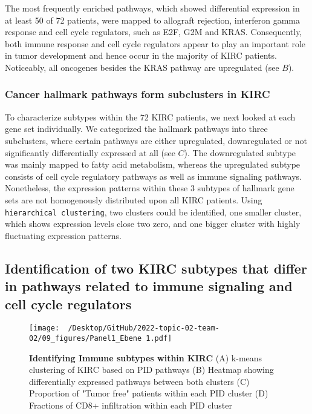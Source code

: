 \documentclass[
  parskip,
  oneside]{scrreprt}
\begin{document}
The most frequently enriched pathways, which showed differential
expression in at least 50 of 72 patients, were mapped to allograft
rejection, interferon gamma response and cell cycle regulators, such as
E2F, G2M and KRAS. Consequently, both immune response and cell cycle
regulators appear to play an important role in tumor development and
hence occur in the majority of KIRC patients. Noticeably, all oncogenes
besides the KRAS pathway are upregulated (see  \(B\)).

\hypertarget{cancer-hallmark-pathways-form-subclusters-in-kirc}{%
\subsubsection{Cancer hallmark pathways form subclusters in
KIRC}\label{cancer-hallmark-pathways-form-subclusters-in-kirc}}

To characterize subtypes within the 72 KIRC patients, we next looked at
each gene set individually. We categorized the hallmark pathways into
three subclusters, where certain pathways are either upregulated,
downregulated or not significantly differentially expressed at all (see
 \(C\)). The downregulated subtype was mainly mapped to
fatty acid metabolism, whereas the upregulated subtype consists of cell
cycle regulatory pathways as well as immune signaling pathways.
Nonetheless, the expression patterns within these 3 subtypes of hallmark
gene sets are not homogenously distributed upon all KIRC patients. Using
\texttt{hierarchical\ clustering}, two clusters could be identified, one
smaller cluster, which shows expression levels close two zero, and one
bigger cluster with highly fluctuating expression patterns.

\hypertarget{identification-of-two-kirc-subtypes-that-differ-in-pathways-related-to-immune-signaling-and-cell-cycle-regulators}{%
\subsection{Identification of two KIRC subtypes that differ in pathways
related to immune signaling and cell cycle
regulators}\label{identification-of-two-kirc-subtypes-that-differ-in-pathways-related-to-immune-signaling-and-cell-cycle-regulators}}

\begin{figure}[h]
  \texttt{[image: ~/Desktop/GitHub/2022-topic-02-team-02/09\_figures/Panel1\_Ebene 1.pdf]}
  \caption{\textbf{Identifying Immune subtypes within KIRC }(A) k-means clustering of KIRC based on PID pathways (B) Heatmap showing differentially expressed pathways between both clusters (C) Proportion of "Tumor free" patients within each PID cluster (D) Fractions of CD8+ infiltration within each PID cluster}
  \label{pid}
\end{figure}
\end{document}
